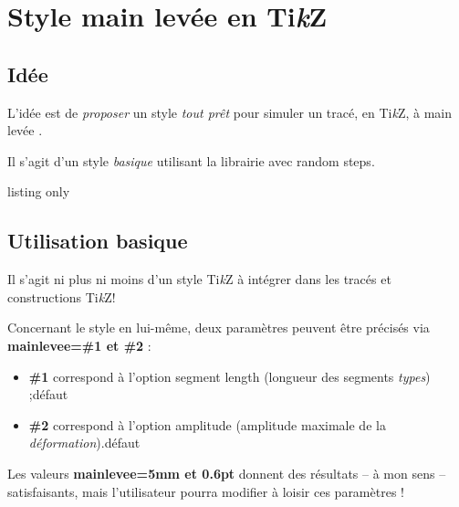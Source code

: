 \documentclass[a4paper,french,11pt]{article}
\providecommand\tikzlogo{Ti\textit{k}Z}
\let\TikZ\tikzlogo
\newcommand\ctex[1]{\tcbox[vignettelatex]{#1}}
\newcommand\Cle[1]{{\bfseries\sffamily\textlangle #1\textrangle}}
\begin{document}
\section{Style \og main levée \fg{} en \TikZ}\label{mainlevee}

\subsection{Idée}

\begin{tipblock}
L'idée est de \textit{proposer} un style \textit{tout prêt} pour simuler un tracé, en \TikZ, à \og main levée \fg.

Il s'agit d'un style \textit{basique} utilisant la librairie \ctex{decorations} avec \textsf{random steps}.
\end{tipblock}

\begin{PresCodeTexPL}{listing only}
\end{PresCodeTexPL}

\subsection{Utilisation basique}

\begin{noteblock}
Il s'agit ni plus ni moins d'un style \TikZ{} à intégrer dans les tracés et constructions \TikZ !
\end{noteblock}

\begin{cautionblock}
Concernant le style en lui-même, deux paramètres peuvent être précisés via \Cle{mainlevee=\#1 et \#2} :

\begin{itemize}
	\item \Cle{\#1} correspond à l'option \textsf{segment length} (longueur des segments \textit{types}) ;\hfill{}défaut \Cle{5mm}
	\item \Cle{\#2} correspond à l'option \textsf{amplitude} (amplitude maximale de la \textit{déformation}).\hfill{}défaut \Cle{0.6pt}
\end{itemize}

Les valeurs \Cle{mainlevee=5mm et 0.6pt} donnent des résultats -- à mon sens -- satisfaisants, mais l'utilisateur pourra modifier à loisir ces paramètres !
\end{cautionblock}
\end{document}
